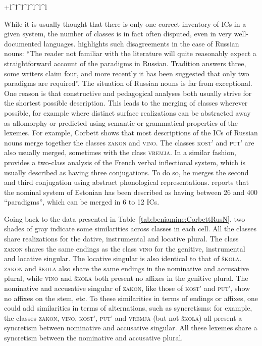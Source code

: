 \documentclass[output=paper]{langscibook}
\begin{document}
\begin{table}
\begin{tabular}{+l^l^l^l^l^l^l}
            \lspbottomrule
        \end{tabular}
        
        \caption{Six broad inflection classes of Russian in Roman transliteration, according to~\citet[~203]{Corbett1982} }
        \label{tab:beniamine:CorbettRusN}
    \end{table}
    
    While it is usually thought that there is only one correct inventory of ICs in a given system, the number of classes is in fact often disputed, even in very well-documented languages. \citet[~202]{Corbett1982} highlights such disagreements in the case of Russian nouns: ``The reader not familiar with the literature will quite reasonably expect a straightforward account of the paradigms in Russian. Tradition answers three, some writers claim four, and more recently it has been suggested that only two paradigms are required''. The situation of Russian nouns is far from exceptional. One reason is that constructive and pedagogical analyses both usually strive for the shortest possible description. This leads to the merging of classes wherever possible, for example where distinct surface realizations can be abstracted away as allomorphy or predicted using semantic or grammatical properties of the lexemes. For example, Corbett shows that most descriptions of the ICs of Russian nouns merge together the classes \textsc{zakon} and \textsc{vino}. The classes \textsc{kost'} and \textsc{put'} are also usually merged, sometimes with the class \textsc{vremja}. In a similar fashion, \citet{Plenat87} provides a two-class analysis of the French verbal inflectional system, which is usually described as having three conjugations. To do so, he merges the second and third conjugation using abstract phonological representations. \citet{Blevins2004} reports that the nominal system of Estonian has been described as having between 26 and 400 ``paradigms'', which can be merged in 6 to 12 ICs.
    
    Going back to the data presented in Table~\ref{tab:beniamine:CorbettRusN}, two shades of gray indicate some similarities across classes in each cell. All the classes share realizations for the dative, instrumental and locative plural. The class \textsc{zakon} shares the same endings as the class \textsc{vino} for the genitive, instrumental and locative singular. The locative singular is also identical to that of \textsc{škola}. \textsc{zakon} and \textsc{škola} also share the same endings in the nominative and accusative plural, while \textsc{vino} and \textsc{škola} both present no affixes in the genitive plural. The nominative and accusative singular of \textsc{zakon}, like those of \textsc{kost'} and \textsc{put'}, show no affixes on the stem, etc. To these similarities in terms of endings or affixes, one could add similarities in terms of alternations, such as syncretisms: for example, the classes \textsc{zakon}, \textsc{vino}, \textsc{kost'}, \textsc{put'} and \textsc{vremja} (but not \textsc{škola}) all present a syncretism between nominative and accusative singular. All these lexemes share a syncretism between the nominative and accusative plural.
    
\end{document}
